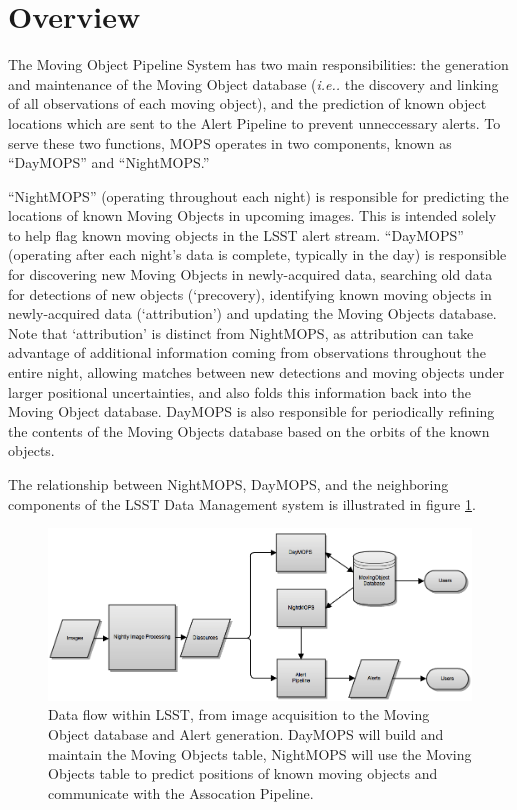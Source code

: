 \section{Overview}

The Moving Object Pipeline System has two main responsibilities: the
generation and maintenance of the Moving Object database ({\it i.e..}
the discovery and linking of all observations of each moving object),
and the prediction of known object locations which are sent to the
Alert Pipeline to prevent unneccessary alerts.  To serve these
two functions, MOPS operates in two components, known as ``DayMOPS''
and ``NightMOPS.''

``NightMOPS'' (operating throughout each night) is responsible for
predicting the locations of known Moving Objects in upcoming
images. This is intended solely to help flag known moving objects in
the LSST alert stream.  ``DayMOPS'' (operating after each night's data
is complete, typically in the day) is responsible for discovering new
Moving Objects in newly-acquired data, searching old data for
detections of new objects (`precovery), identifying known moving
objects in newly-acquired data (`attribution') and updating the Moving
Objects database. Note that `attribution' is distinct from
NightMOPS, as attribution can take advantage of additional information
coming from observations throughout the entire night, allowing matches
between new detections and moving objects under larger positional
uncertainties, and also folds this information back into the Moving
Object database. DayMOPS is also responsible for periodically refining
the contents of the Moving Objects database based on the orbits of the
known objects.

The relationship between NightMOPS, DayMOPS, and the neighboring
components of the LSST Data Management system is illustrated in
figure \ref{mopsWithinLsst}.

\begin{figure}[!ht]
\centering
  \includegraphics[width=12cm]{illustrations/MOPSinLSST.png}
\caption[Data flow between MOPS and LSST.]{Data flow within LSST, from image acquisition to the Moving
  Object database and Alert generation.  DayMOPS will build and maintain the
  Moving Objects table, NightMOPS will use the Moving Objects table to
  predict positions of known moving objects and
  communicate with the Assocation Pipeline.  }
\label{mopsWithinLsst}
\end{figure}

